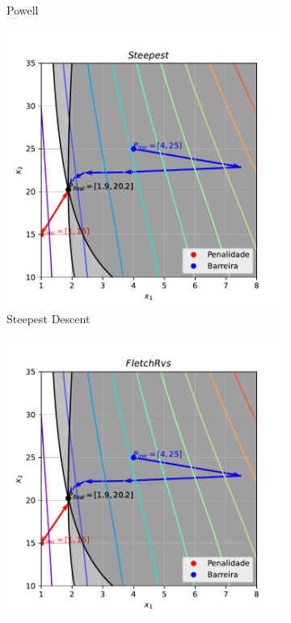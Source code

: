 \documentclass[10pt, a4paper]{article}
\begin{document}
\begin{figure}[htpb]
\begin{subfigure}[b]{0.32\textwidth}
    \caption{Powell}
    \label{fig:q2_powell}
  \end{subfigure}
  \hfill
  \begin{subfigure}[b]{0.32\textwidth}
    \centering
    \includegraphics[width=\textwidth]{images/q2_Steepest.pdf}
    \caption{Steepest Descent}
    \label{fig:q2_steepest}
  \end{subfigure}
  \hfill
  \begin{subfigure}[b]{0.32\textwidth}
    \centering
    \includegraphics[width=\textwidth]{images/q2_FletchRvs.pdf}

\end{subfigure}
\end{figure}
\end{document}
